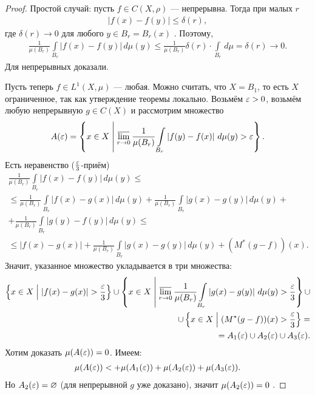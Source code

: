 \begin{proof}
 Простой случай: пусть $f \in C(X, \rho)$  --- непрерывна. Тогда при малых $r$  \begin{align*}
  \left| f(x) - f(y) \right| \leqslant \delta(r)
 ,\end{align*} где $\delta(r) \to 0$  для любого $y \in B_r = B_r(x)$ . Поэтому, \begin{align*}
  \frac{1}{\mu(B_r)} \int\limits_{B_r} \left| f(x) - f(y) \right| \, d\mu(y) \leqslant \frac{1}{\mu(B_r)} \delta(r) \cdot \int\limits_{B_r} \, d\mu   = \delta(r) \to 0
 .\end{align*} Для непрерывных доказали.

 Пусть теперь  $f \in L^{1}(X, \mu)$ --- любая. Можно считать, что $X = B_1$, то есть $X$ ограниченное, так как утверждение теоремы локально. Возьмём $\varepsilon > 0$, возьмём любую непрерывную $g \in C(X)$ и рассмотрим множество \begin{align*}
  A(\varepsilon) = \left\{ x \in X \;\middle|\; \varlimsup_{r \to 0} \frac{1}{\mu(B_r)} \int\limits_{B_r}  \left| f(y) - f(x) \right| \, d\mu(y) > \varepsilon   \right\}
 .\end{align*} Есть неравенство ($\frac{\varepsilon}{3}$-приём) \begin{align*}
  \frac{1}{\mu(B_r)} \int\limits_{B_r} \left| f(x) - f(y) \right| \, d\mu(y) \leqslant \\
   \leqslant \frac{1}{\mu(B_r)} \int\limits_{B_r} \left| f(x) - g(x) \right| \, d\mu(y)  + \frac{1}{\mu(B_r)} \int\limits_{B_r} \left| g(x) - g(y) \right| \, d\mu(y)  + \\ + \frac{1}{\mu(B_r)} \int\limits_{B_r} \left| g(y) - f(y) \right| \, d\mu(y) \leqslant \\
   \leqslant \left| f(x) - g(x) \right| + \frac{1}{\mu(B_r)} \int\limits_{B_r} \left| g(x) - g(y) \right| \, d\mu(y) + (M^{\ast}(g-f))(x)
 .\end{align*} Значит, указанное множество укладывается в три множества: \begin{align*}
 \left\{ x \in X \;\middle|\; \left| f(x) - g(x) \right| > \frac{\varepsilon}{3} \right\} \cup \left\{ x \in X \;\middle|\; \varlimsup_{r \to 0} \frac{1}{\mu(B_r)} \int\limits_{B_r} \left| g(x) - g(y) \right| \, d\mu(y) > \frac{\varepsilon}{3}   \right\} \cup \\ \cup \left\{ x \in X \;\middle|\; (M^{\ast}(g - f))(x) > \frac{\varepsilon}{3} \right\} = \\
 = A_{1}(\varepsilon) \cup A_2(\varepsilon) \cup A_3(\varepsilon)
 .\end{align*} Хотим доказать $\mu(A(\varepsilon)) = 0$. Имеем:  \begin{align*}
  \mu(A(\varepsilon)) <+ \mu(A_1(\varepsilon)) + \mu(A_2(\varepsilon)) + \mu(A_3(\varepsilon))
 .\end{align*} Но $A_2(\varepsilon) = \varnothing$  (для непрерывной $g$ уже доказано), значит $\mu(A_2(\varepsilon)) = 0$ .


\end{proof}
